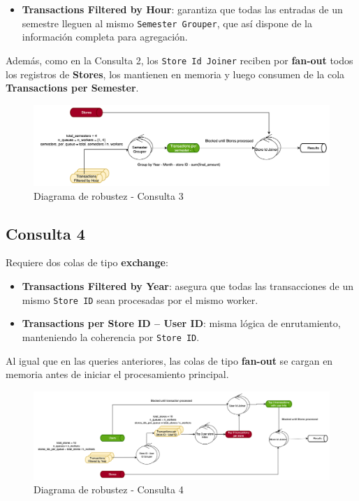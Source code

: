 \documentclass[titlepage,a4paper]{article}
\begin{document}
\begin{itemize}
    \item \textbf{Transactions Filtered by Hour}: garantiza que todas las entradas de un semestre lleguen al mismo \texttt{Semester Grouper}, que así dispone de la información completa para agregación.
\end{itemize}

Además, como en la Consulta 2, los \texttt{Store Id Joiner} reciben por \textbf{fan-out} todos los registros de \textbf{Stores}, los mantienen en memoria y luego consumen de la cola \textbf{Transactions per Semester}.

\begin{figure}[H]
    \centering
    \includegraphics[width=1.0\textwidth]{consulta3.png}
    \caption{Diagrama de robustez - Consulta 3}
\end{figure}



\subsection*{Consulta 4}
Requiere dos colas de tipo \textbf{exchange}:

\begin{itemize}
    \item \textbf{Transactions Filtered by Year}: asegura que todas las transacciones de un mismo \texttt{Store ID} sean procesadas por el mismo worker.
    \item \textbf{Transactions per Store ID -- User ID}: misma lógica de enrutamiento, manteniendo la coherencia por \texttt{Store ID}.
\end{itemize}

Al igual que en las queries anteriores, las colas de tipo \textbf{fan-out} se cargan en memoria antes de iniciar el procesamiento principal.


\begin{figure}[H]
    \centering
    \includegraphics[width=1.0\textwidth]{consulta4.png}
    \caption{Diagrama de robustez - Consulta 4}
\end{figure}
\end{document}
